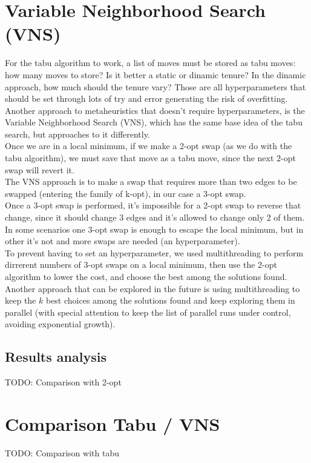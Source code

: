 \section{Variable Neighborhood Search (VNS)}
For the tabu algorithm to work, a list of moves must be stored as tabu moves: how many moves to store? Is it better a static or dinamic tenure? In the dinamic approach, how much should the tenure vary? Those are all hyperparameters that should be set through lots of try and error generating the risk of overfitting.\\
Another approach to metaheuristics that doesn't require hyperparameters, is the Variable Neighborhood Search (VNS), which has the same base idea of the tabu search, but approaches to it differently.\\
Once we are in a local minimum, if we make a 2-opt swap (as we do with the tabu algorithm), we must save that move as a tabu move, since the next 2-opt swap will revert it.\\
The VNS approach is to make a swap that requires more than two edges to be swapped (entering the family of k-opt), in our case a 3-opt swap.\\
Once a 3-opt swap is performed, it's impossible for a 2-opt swap to reverse that change, since it should change 3 edges and it's allowed to change only 2 of them.\\
In some scenarios one 3-opt swap is enough to escape the local minimum, but in other it's not and more swaps are needed (an hyperparameter).\\
To prevent having to set an hyperparameter, we used multithreading to perform dirrerent numbers of 3-opt swaps on a local minimum, then use the 2-opt algorithm to lower the cost, and choose the best among the solutions found.\\
Another approach that can be explored in the future is using multithreading to keep the $k$ best choices among the solutions found and keep exploring them in parallel (with special attention to keep the list of parallel runs under control, avoiding exponential growth).
\subsection{Results analysis}
TODO: Comparison with 2-opt
\section{Comparison Tabu / VNS}
TODO: Comparison with tabu